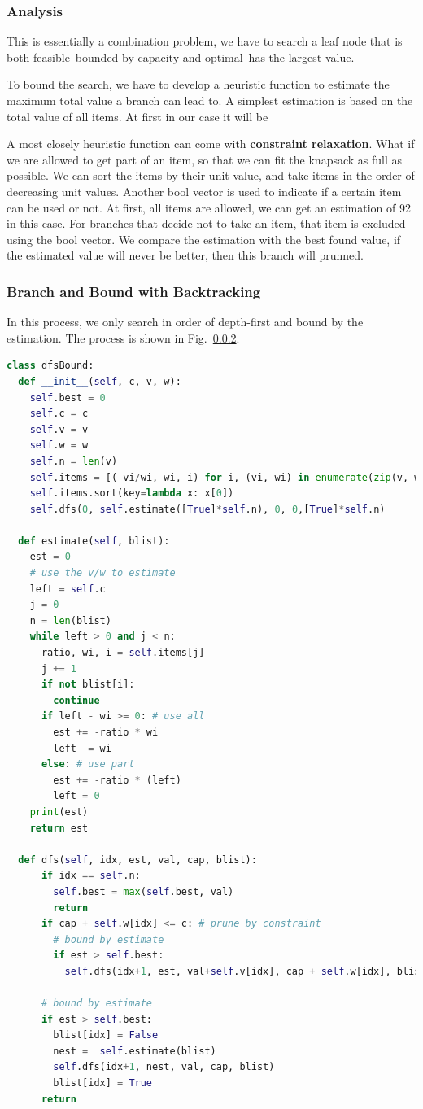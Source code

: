 \documentclass[../main.tex]{subfiles}
\begin{document}
\subsubsection{Analysis} This is essentially a combination problem, we have to search a leaf node that is both feasible--bounded by capacity and optimal--has the largest value. 

To bound the search, we have to develop a heuristic function to estimate the maximum total value a branch can lead to. A simplest estimation is based on the total value of all items. At first in our case it will be  

A most closely heuristic function can come with \textbf{constraint relaxation}. What if we are allowed to get part of an item, so that we can fit the knapsack as full as possible. We can sort the items by their unit value, and take items in the order of decreasing unit values. Another bool vector is used to indicate if a certain item can be used or not. At first, all items are allowed, we can get an estimation of 92 in this case. For branches that decide not to take an item, that item is excluded using the bool vector.  We compare the estimation with the best found value, if the estimated value will never be better, then this branch will prunned. 
\subsubsection{Branch and Bound with Backtracking}
In this process, we only search in order of depth-first and bound by the estimation. The process is shown in Fig.~\ref{}. 
\begin{lstlisting}[language=Python]
class dfsBound:
  def __init__(self, c, v, w):
    self.best = 0 
    self.c = c
    self.v = v
    self.w = w
    self.n = len(v)
    self.items = [(-vi/wi, wi, i) for i, (vi, wi) in enumerate(zip(v, w))]
    self.items.sort(key=lambda x: x[0])
    self.dfs(0, self.estimate([True]*self.n), 0, 0,[True]*self.n)

  def estimate(self, blist):
    est = 0
    # use the v/w to estimate
    left = self.c
    j = 0
    n = len(blist)
    while left > 0 and j < n:
      ratio, wi, i = self.items[j]
      j += 1
      if not blist[i]:
        continue
      if left - wi >= 0: # use all
        est += -ratio * wi
        left -= wi
      else: # use part
        est += -ratio * (left)
        left = 0 
    print(est)
    return est
  
  def dfs(self, idx, est, val, cap, blist):
      if idx == self.n:
        self.best = max(self.best, val)
        return
      if cap + self.w[idx] <= c: # prune by constraint
        # bound by estimate
        if est > self.best:
          self.dfs(idx+1, est, val+self.v[idx], cap + self.w[idx], blist)

      # bound by estimate
      if est > self.best:
        blist[idx] = False
        nest =  self.estimate(blist)
        self.dfs(idx+1, nest, val, cap, blist) 
        blist[idx] = True
      return
\end{lstlisting}
\end{document}

